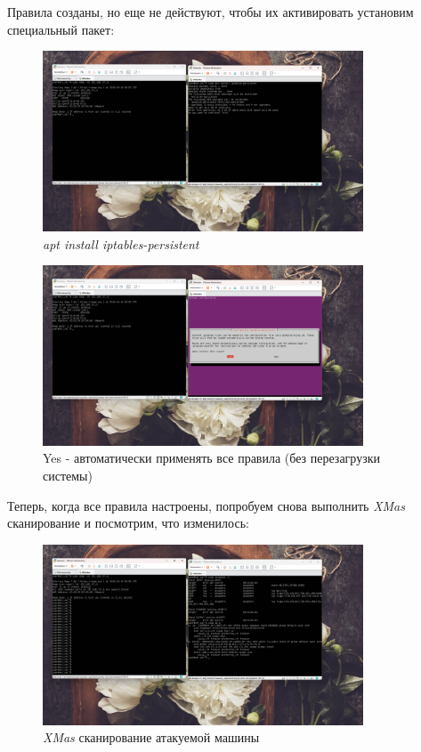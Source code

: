 \documentclass[a4paper]{article}
\begin{document}
  Правила созданы, но еще не действуют, чтобы их активировать установим специальный пакет:

  \begin{figure}[H]
    \centering
    \includegraphics[width=0.85\textwidth]{03_00 (50)}
    \caption{\textit{apt install iptables-persistent}}
    \label{img:50}
  \end{figure}

  \begin{figure}[H]
    \centering
    \includegraphics[width=0.85\textwidth]{03_00 (51)}
    \caption{Yes - автоматически применять все правила (без перезагрузки системы)}
    \label{img:51}
  \end{figure}

  Теперь, когда все правила настроены, попробуем снова выполнить \textit{XMas} сканирование
  и посмотрим, что изменилось:

  \begin{figure}[H]
    \centering
    \includegraphics[width=0.85\textwidth]{03_00 (53)}
    \caption{\textit{XMas} сканирование атакуемой машины}
    \label{img:52}
  \end{figure}
\end{document}
